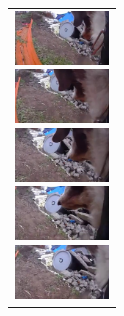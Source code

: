 \begin{enumerate}
\begin{end}
\begin{figure}[H]
\begin{tabular}{l}
      \begin{minipage}{0.165\hsize}
        \begin{center}
          \includegraphics[clip, width=2.5cm]{./Figures/still_commandmatemate1.eps}
        \end{center}
      \end{minipage}
      \begin{minipage}{0.165\hsize}
        \begin{center}
          \includegraphics[clip, width=2.5cm]{./Figures/still_commandmatemate2.eps}
        \end{center}
      \end{minipage}
      \begin{minipage}{0.165\hsize}
        \begin{center}
          \includegraphics[clip, width=2.5cm]{./Figures/still_commandmatemate3.eps}
        \end{center}
      \end{minipage}
      \begin{minipage}{0.165\hsize}
        \begin{center}
          \includegraphics[clip, width=2.5cm]{./Figures/still_commandmatemate4.eps}
        \end{center}
      \end{minipage}
      \begin{minipage}{0.165\hsize}
        \begin{center}
          \includegraphics[clip, width=2.5cm]{./Figures/still_commandmatemate5.eps}

\end{center}
\end{minipage}
\end{tabular}
\end{figure}
\end{end}
\end{enumerate}
